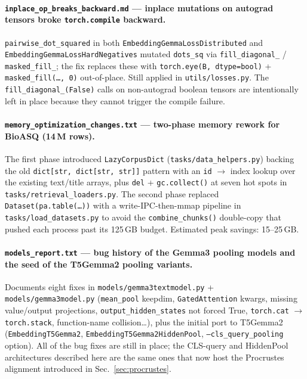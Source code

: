 \documentclass{article}
\begin{document}
\paragraph{\texttt{inplace\_op\_breaks\_backward.md} --- inplace
mutations on autograd tensors broke \texttt{torch.compile} backward.}
\texttt{pairwise\_dot\_squared} in both
\texttt{EmbeddingGemmaLossDistributed} and
\texttt{EmbeddingGemmaLossHardNegatives} mutated \texttt{dots\_sq} via
\texttt{fill\_diagonal\_} / \texttt{masked\_fill\_}; the fix replaces
these with \texttt{torch.eye(B, dtype=bool)} +
\texttt{masked\_fill(\dots, 0)} out-of-place. Still applied in
\texttt{utils/losses.py}. The \texttt{fill\_diagonal\_(False)} calls
on non-autograd boolean tensors are intentionally left in place
because they cannot trigger the compile failure.

\paragraph{\texttt{memory\_optimization\_changes.txt} --- two-phase
memory rework for BioASQ (14\,M rows).} The first phase introduced
\texttt{LazyCorpusDict} (\texttt{tasks/data\_helpers.py}) backing the
old \texttt{dict[str, dict[str, str]]} pattern with an \texttt{id}
$\to$ index lookup over the existing text/title arrays, plus
\texttt{del} + \texttt{gc.collect()} at seven hot spots in
\texttt{tasks/retrieval\_loaders.py}. The second phase replaced
\texttt{Dataset(pa.table(\dots))} with a write-IPC-then-mmap
pipeline in \texttt{tasks/load\_datasets.py} to avoid the
\texttt{combine\_chunks()} double-copy that pushed each process past
its 125\,GB budget. Estimated peak savings: 15--25\,GB.

\paragraph{\texttt{models\_report.txt} --- bug history of the Gemma3
pooling models and the seed of the T5Gemma2 pooling variants.}
Documents eight fixes in \texttt{models/gemma3textmodel.py} +
\texttt{models/gemma3model.py} (\texttt{mean\_pool} keepdim,
\texttt{GatedAttention} kwargs, missing value/output projections,
\texttt{output\_hidden\_states} not forced True,
\texttt{torch.cat} $\to$ \texttt{torch.stack}, function-name
collision\dots), plus the initial port to T5Gemma2
(\texttt{EmbeddingT5Gemma2}, \texttt{EmbeddingT5Gemma2HiddenPool},
\texttt{--cls\_query\_pooling} option). All of the bug fixes are
still in place; the CLS-query and HiddenPool architectures described
here are the same ones that now host the Procrustes alignment
introduced in Sec.~\ref{sec:procrustes}.
\end{document}
